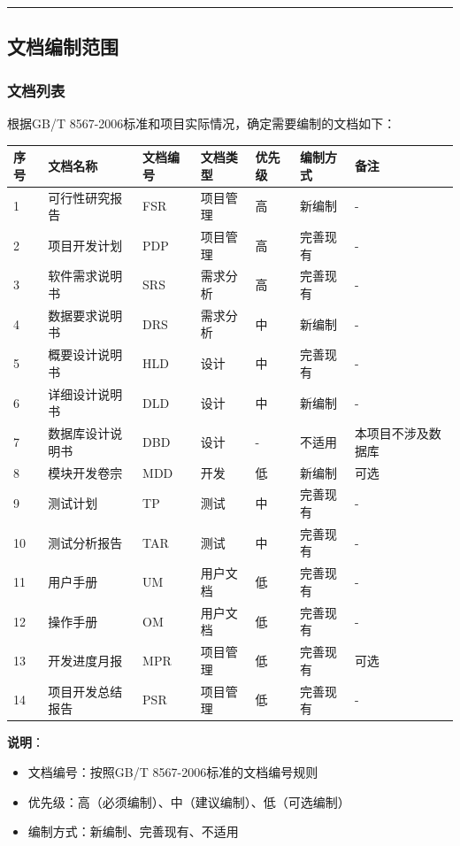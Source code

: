 \documentclass[12pt,a4paper]{article}
\numberwithin{equation}{section}  %
\begin{document}
\hrule
\subsection{文档编制范围}
\subsubsection{文档列表}
根据GB/T 8567-2006标准和项目实际情况，确定需要编制的文档如下：

\begin{longtable}{|p{2.29cm}|p{2.29cm}|p{2.29cm}|p{2.29cm}|p{2.29cm}|p{2.29cm}|p{2.29cm}|}
\hline
序号 & 文档名称 & 文档编号 & 文档类型 & 优先级 & 编制方式 & 备注 \\
\hline
1 & 可行性研究报告 & FSR & 项目管理 & 高 & 新编制 & - \\
2 & 项目开发计划 & PDP & 项目管理 & 高 & 完善现有 & - \\
3 & 软件需求说明书 & SRS & 需求分析 & 高 & 完善现有 & - \\
4 & 数据要求说明书 & DRS & 需求分析 & 中 & 新编制 & - \\
5 & 概要设计说明书 & HLD & 设计 & 中 & 完善现有 & - \\
6 & 详细设计说明书 & DLD & 设计 & 中 & 新编制 & - \\
7 & 数据库设计说明书 & DBD & 设计 & - & 不适用 & 本项目不涉及数据库 \\
8 & 模块开发卷宗 & MDD & 开发 & 低 & 新编制 & 可选 \\
9 & 测试计划 & TP & 测试 & 中 & 完善现有 & - \\
10 & 测试分析报告 & TAR & 测试 & 中 & 完善现有 & - \\
11 & 用户手册 & UM & 用户文档 & 低 & 完善现有 & - \\
12 & 操作手册 & OM & 用户文档 & 低 & 完善现有 & - \\
13 & 开发进度月报 & MPR & 项目管理 & 低 & 完善现有 & 可选 \\
14 & 项目开发总结报告 & PSR & 项目管理 & 低 & 完善现有 & - \\
\hline
\end{longtable}

\textbf{说明}：
\begin{itemize}
\item 文档编号：按照GB/T 8567-2006标准的文档编号规则
\item 优先级：高（必须编制）、中（建议编制）、低（可选编制）
\item 编制方式：新编制、完善现有、不适用
\end{itemize}
\end{document}
